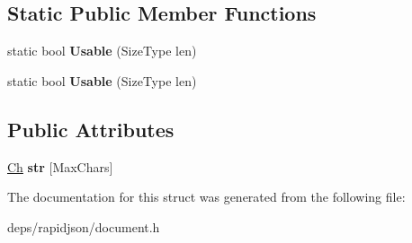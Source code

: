 \subsection*{Static Public Member Functions}
\begin{DoxyCompactItemize}
\item 
static bool {\bfseries Usable} (Size\+Type len)\hypertarget{struct_generic_value_1_1_short_string_a73e40f625c1abbd84f95ac7fff8365f7}{}\label{struct_generic_value_1_1_short_string_a73e40f625c1abbd84f95ac7fff8365f7}

\item 
static bool {\bfseries Usable} (Size\+Type len)\hypertarget{struct_generic_value_1_1_short_string_a73e40f625c1abbd84f95ac7fff8365f7}{}\label{struct_generic_value_1_1_short_string_a73e40f625c1abbd84f95ac7fff8365f7}

\end{DoxyCompactItemize}
\subsection*{Public Attributes}
\begin{DoxyCompactItemize}
\item 
\hyperlink{class_generic_value_ade0e0ce64ccd5d852da57a35e720bafb}{Ch} {\bfseries str} \mbox{[}Max\+Chars\mbox{]}\hypertarget{struct_generic_value_1_1_short_string_a0e2a5204df2d9fdfd2ee18906cb282dd}{}\label{struct_generic_value_1_1_short_string_a0e2a5204df2d9fdfd2ee18906cb282dd}

\end{DoxyCompactItemize}


The documentation for this struct was generated from the following file\+:\begin{DoxyCompactItemize}
\item 
deps/rapidjson/document.\+h\end{DoxyCompactItemize}
